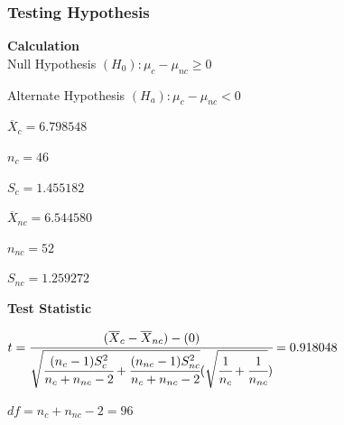\documentclass[11pt,]{beamer}
\begin{document}
    
    
    
    
    
    
    
    
    
    
    

\begin{frame}

\frametitle{Testing Hypothesis}

\textbf{Calculation}\\
Null Hypothesis $(H_0) :  \mu_{c} - \mu_{nc} \geq 0$

\bigskip

Alternate Hypothesis $(H_a) : \mu_{c} - \mu_{nc} < 0$

\bigskip

$\overline{X}_{c} = 6.798548$

\bigskip

$n_{c} = 46$

\bigskip

$S_{c} = 1.455182$

\bigskip

$\overline{X}_{nc} = 6.544580$

\bigskip

$n_{nc} = 52$

\bigskip

$S_{nc} = 1.259272$

\end{frame}

\begin{frame}[fragile, t]

    \textbf{Test Statistic}
    
    \bigskip
    
    $ t = \cfrac{(\overline{X}_{c} - \overline{X}_{nc}) - (0)}{\sqrt{\cfrac{{(n_{c}-1)}S_{c}^{2}}{n_{c}+n_{nc} -2} + \cfrac{({n_{nc}}-1)S_{nc}^{2}}{n_{c}+n_{nc} -2}}(\sqrt{\cfrac{1}{n_{c}} + \cfrac{1}{n_{nc}}})} = 0.918048$
    
    \bigskip
    \bigskip
    $df = {n_{c}+n_{nc} -2} = 96$
    
\end{frame}
\end{document}
